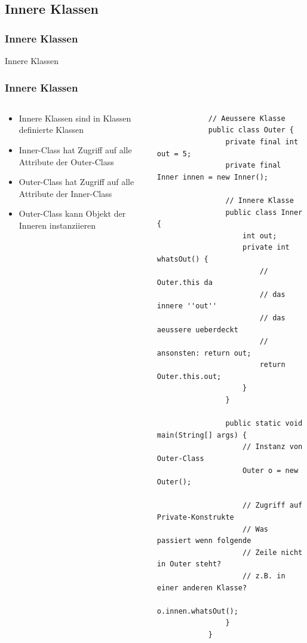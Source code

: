 \subsection{Innere Klassen}
\begin{frame}[fragile]
	\frametitle{Innere Klassen}
	\huge Innere Klassen
\end{frame}

\begin{frame}[fragile]
	\frametitle{Innere Klassen}
	\begin{columns}
		\begin{column}{0.5\textwidth}
			\small
			\begin{itemize}
			  \item Innere Klassen sind in Klassen 
			  definierte Klassen
			  \item Inner-Class hat Zugriff auf alle
			  Attribute der Outer-Class
			  \item Outer-Class hat Zugriff auf alle
			  Attribute der Inner-Class
			  \item Outer-Class kann Objekt der Inneren 
			  instanziieren
			\end{itemize}
		\end{column}
		\begin{column}{0.5\textwidth}
			\begin{lstlisting}
			// Aeussere Klasse
			public class Outer {
				private final int out = 5;
				private final Inner innen = new Inner();
									
				// Innere Klasse
				public class Inner {
					int out;
					private int whatsOut() {
						// Outer.this da
						// das innere ''out''
						// das aeussere ueberdeckt
						// ansonsten: return out;
						return Outer.this.out;
					}
				}
				
				public static void main(String[] args) {
					// Instanz von Outer-Class
					Outer o = new Outer();
											
					// Zugriff auf Private-Konstrukte 
					// Was passiert wenn folgende 
					// Zeile nicht in Outer steht? 
					// z.B. in einer anderen Klasse?
					o.innen.whatsOut();
				}
			}
			\end{lstlisting}
		\end{column}
	\end{columns}
\end{frame}


